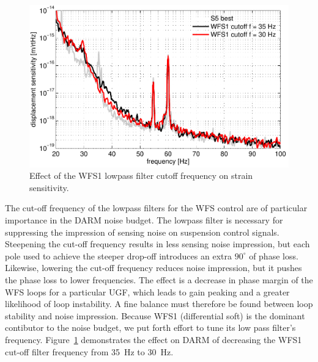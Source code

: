 
\begin{figure}
\begin{centering}
\includegraphics[width=1.0\textwidth]{figures/cutoffWFS1_DARMcompare.pdf}
\caption[Effect of the WFS1 lowpass filter cutoff frequency on strain
sensitivity.]{Effect of the WFS1 lowpass filter cutoff frequency on
  strain sensitivity.}
\label{fig:WFS1cutoff}
\end{centering}
\end{figure}

The cut-off frequency of the lowpass filters for the WFS control are
of particular importance in the DARM noise budget. The lowpass filter
is necessary for suppressing the impression of sensing noise on
suspension control signals. Steepening the cut-off frequency results
in less sensing noise impression, but each pole used to achieve the
steeper drop-off introduces an extra $90^{\circ}$ of phase
loss. Likewise, lowering the cut-off frequency reduces noise
impression, but it pushes the phase loss to lower frequencies. The
effect is a decrease in phase margin of the WFS loops for a particular
UGF, which leads to gain peaking and a greater likelihood of loop
instability. A fine balance must therefore be found between loop
stability and noise impression. Because WFS1 (differential soft) is
the dominant contibutor to the noise budget, we put forth effort to
tune its low pass filter's frequency. Figure~\ref{fig:WFS1cutoff}
demonstrates the effect on DARM of decreasing the WFS1 cut-off filter
frequency from 35~Hz to 30~Hz.


